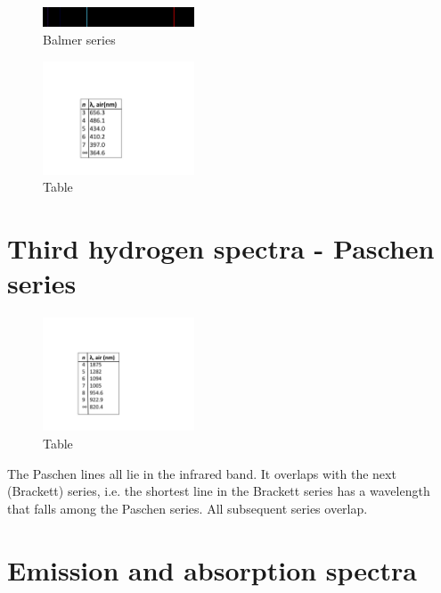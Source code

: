 \documentclass{article}
\begin{document}
\begin{figure}[h]
\begin{center}
\includegraphics[width=0.4\textwidth]{balmerwiki} %
\caption{Balmer series}
\end{center}
\end{figure}

\begin{figure}[h]
\begin{center}
\includegraphics[width=0.4\textwidth]{balmertable} %
\caption{Table}
\end{center}
\end{figure}


\section{Third hydrogen spectra - Paschen series}
\begin{figure}[h]
\begin{center}
\includegraphics[width=0.4\textwidth]{paschentable} %
\caption{Table}
\end{center}
\end{figure}

The Paschen lines all lie in the infrared band. It overlaps with the next (Brackett) series, i.e. the shortest line in the Brackett series has a wavelength that falls among the Paschen series. All subsequent series overlap.

\section{Emission and absorption spectra}
\end{document}

